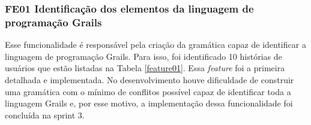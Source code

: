 \subsubsection{FE01 Identificação dos elementos da linguagem de programação Grails}
Esse funcionalidade é responsável pela criação da gramática capaz de identificar a linguagem de programação Grails. Para isso, foi identificado 10 histórias de usuários que estão listadas na Tabela \ref{feature01}. Essa \textit{feature} foi a primeira detalhada e implementada. No desenvolvimento houve dificuldade de construir uma gramática com o mínimo de conflitos possível capaz de identificar toda a linguagem Grails e, por esse motivo, a implementação dessa funcionalidade foi concluída na sprint 3.

